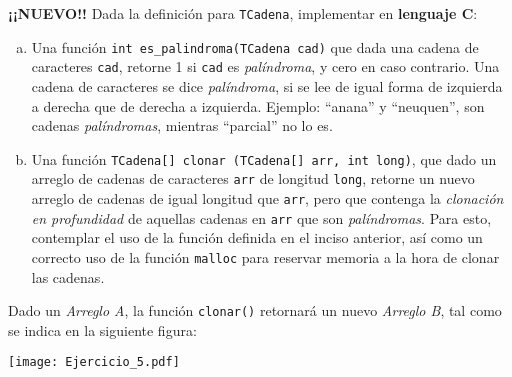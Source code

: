 \documentclass[12pt,a4paper]{article}
\begin{document}
 \textbf{¡¡NUEVO!!} Dada la definición para \texttt{TCadena}, implementar en \textbf{lenguaje C}:
\begin{enumerate}[a)]
	\item Una función \texttt{int es\_palindroma(TCadena cad)} que dada una cadena de caracteres \texttt{cad}, retorne 1 si \texttt{cad} es \textit{palíndroma}, y cero en caso contrario. Una cadena de caracteres se dice \textit{palíndroma}, si se lee de igual forma de izquierda a derecha que de derecha a izquierda. Ejemplo: ``anana'' y ``neuquen'', son cadenas \textit{palíndromas}, mientras ``parcial'' no lo es.
	\item Una función \texttt{TCadena[] clonar (TCadena[] arr, int long)}, que dado un arreglo de cadenas de caracteres \texttt{arr} de longitud \texttt{long}, retorne un nuevo arreglo de cadenas de igual longitud que \texttt{arr}, pero que contenga la \textit{clonación en profundidad} de aquellas cadenas en \texttt{arr} que son \textit{palíndromas}. Para esto, contemplar el uso de la función definida en el inciso anterior, así como un correcto uso de la función \texttt{malloc} para reservar memoria a la hora de clonar las cadenas.
\end{enumerate}
Dado un \textit{Arreglo A}, la función \texttt{clonar()} retornará un nuevo \textit{Arreglo B}, tal como se indica en la siguiente figura:\\
\begin{centering}
	\texttt{[image: Ejercicio\_5.pdf]} 
\end{centering}
\end{document}
